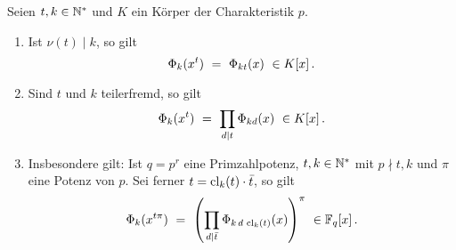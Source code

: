 \begin{satz}
  \label{satz:zusammenhang_unterschiedlicher_kreisteilungspolys}
  Seien $t,k \in \mathbb{N}^\ast$ und $K$ ein Körper der Charakteristik $p$.
  \begin{enumerate}
    \item Ist $\nu(t) \mid k$, so gilt
      \[ \Phi_k(x^t) \speq= \Phi_{kt}(x) \ \in K[x]\,.\]
    \item Sind $t$ und $k$ teilerfremd, so gilt
      \[ \Phi_k(x^t) \ =\  \prod_{d\mid t} \Phi_{kd}(x)\ \in K[x]\,.\]
    \item Insbesondere gilt: Ist $q = p^r$ eine Primzahlpotenz,
      $t,k\in\mathbb{N}^\ast$ mit $p\nmid t,k$ und $\pi$ eine Potenz von $p$. Sei ferner
      $t = \operatorname{cl}_k(t)\cdot \bar t$, so gilt
      \[ \Phi_k(x^{t\pi}) \ =\  
        \left(\prod_{d\mid \bar t} \Phi_{k\,d\,\operatorname{cl}_k(t)} (x)\right)^\pi
        \ \in \mathbb{F}_q[x]\,. \]
  \end{enumerate}
\end{satz}
